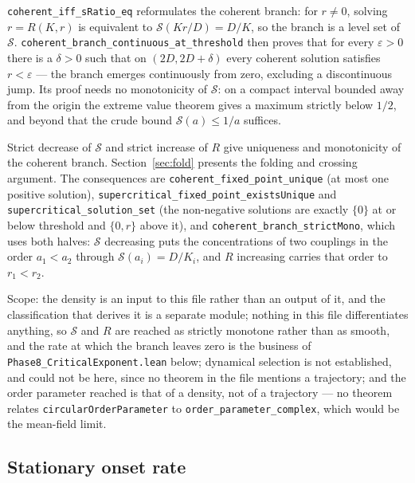 \documentclass{article}
\begin{document}
\nolinkurl{coherent_iff_sRatio_eq} reformulates the coherent branch: for $r \ne 0$, solving $r = R(K,r)$ is equivalent to $\mathcal{S}(Kr/D) = D/K$, so the branch is a level set of $\mathcal{S}$. \nolinkurl{coherent_branch_continuous_at_threshold} then proves that for every $\varepsilon > 0$ there is a $\delta > 0$ such that on $(2D, 2D+\delta)$ every coherent solution satisfies $r < \varepsilon$ --- the branch emerges continuously from zero, excluding a discontinuous jump. Its proof needs no monotonicity of $\mathcal{S}$: on a compact interval bounded away from the origin the extreme value theorem gives a maximum strictly below $1/2$, and beyond that the crude bound $\mathcal{S}(a) \le 1/a$ suffices.

Strict decrease of $\mathcal{S}$ and strict increase of $R$ give uniqueness and monotonicity of the coherent branch. Section~\ref{sec:fold} presents the folding and crossing argument. The consequences are \nolinkurl{coherent_fixed_point_unique} (at most one positive solution), \nolinkurl{supercritical_fixed_point_existsUnique} and \nolinkurl{supercritical_solution_set} (the non-negative solutions are exactly $\{0\}$ at or below threshold and $\{0, r\}$ above it), and \nolinkurl{coherent_branch_strictMono}, which uses both halves: $\mathcal{S}$ decreasing puts the concentrations of two couplings in the order $a_1 < a_2$ through $\mathcal{S}(a_i) = D/K_i$, and $R$ increasing carries that order to $r_1 < r_2$.

Scope: the density is an input to this file rather than an output of it, and the classification that derives it is a separate module; nothing in this file differentiates anything, so $\mathcal{S}$ and $R$ are reached as strictly monotone rather than as smooth, and the rate at which the branch leaves zero is the business of \nolinkurl{Phase8_CriticalExponent.lean} below; dynamical selection is not established, and could not be here, since no theorem in the file mentions a trajectory; and the order parameter reached is that of a density, not of a trajectory --- no theorem relates \texttt{circularOrderParameter} to \nolinkurl{order_parameter_complex}, which would be the mean-field limit.

\subsection{Stationary onset rate}
\end{document}
